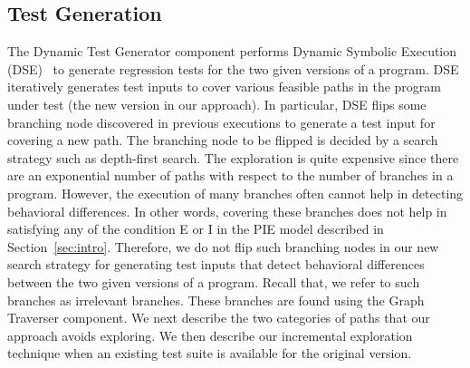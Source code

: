 \subsection{Test Generation}
The Dynamic Test Generator component performs Dynamic Symbolic Execution (DSE)~\cite{Clarke:symbolic,king:symex,dart,cute,exe} to 
generate regression tests for the two given versions of a program. DSE iteratively generates test inputs to cover various feasible paths in the program under test (the new version in our approach). In particular, DSE flips some branching node discovered in previous executions to generate a test input for covering a new path. The branching node to be flipped is decided by a search strategy such as depth-first search. 
The exploration is quite expensive since there are an exponential 
number of paths with respect to the number of branches in a program.
 However, the execution of many branches often cannot help in detecting behavioral differences. 
 In other words, covering these branches does not help in satisfying any of the condition E or I in the PIE model described in Section~\ref{sec:intro}. 
 Therefore, we do not flip such branching nodes in our new search strategy for generating test inputs that detect 
 behavioral differences between the two given versions of a program. Recall that, we refer to such branches as irrelevant branches. These branches are found using the Graph Traverser component.
 We next describe the two categories of paths that our approach avoids exploring. We then describe our incremental exploration technique when an existing test suite is available for the original version.
 
